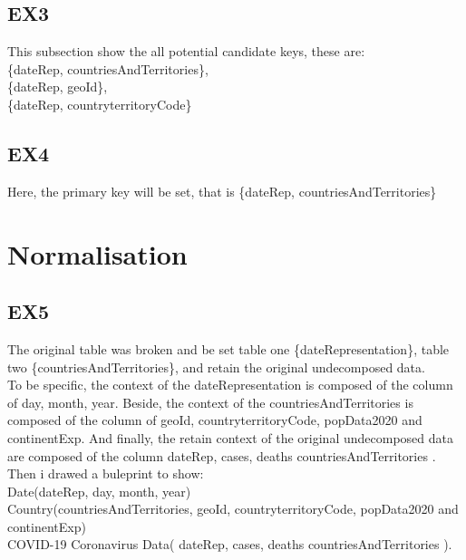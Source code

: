 \documentclass[]{article}
\begin{document}
\begin{titlepage}
		    \subsection{EX3}
		    This subsection show the all potential candidate keys, these are:\\ \{dateRep, countriesAndTerritories\},\\ \{dateRep, geoId\},\\\{dateRep, countryterritoryCode\}
		    \subsection{EX4}
		    Here, the primary key will be set, that is \{dateRep, countriesAndTerritories\}
		
		\section{Normalisation} 
		    \subsection{EX5}
		    The original table was broken and be set table one \{dateRepresentation\}, table two \{countriesAndTerritories\}, and retain the original undecomposed data.\\ To be specific, the context of the dateRepresentation is composed of the column of day, month, year. Beside, the context of the countriesAndTerritories is composed of the column of geoId, countryterritoryCode, popData2020 and continentExp. And finally, the retain context of the original undecomposed data are composed of the column  dateRep, cases, deaths countriesAndTerritories .\\
		    Then i drawed a buleprint to show:\\
		    Date(dateRep, day, month, year)\\
            Country(countriesAndTerritories, geoId, countryterritoryCode, popData2020 and continentExp)\\
            COVID-19 Coronavirus Data( dateRep, cases, deaths countriesAndTerritories  ).

\end{titlepage}
\end{document}
